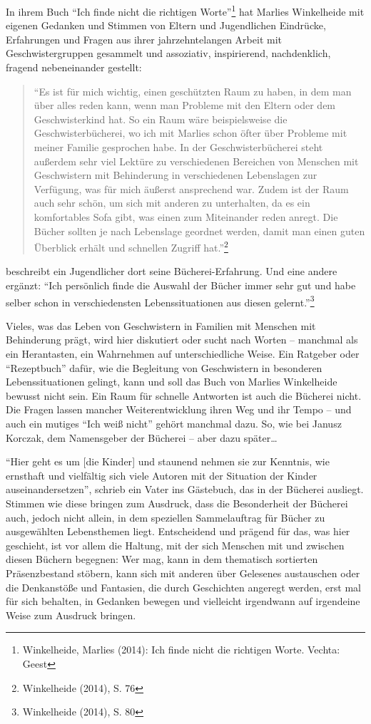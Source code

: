 \documentclass[a4paper,
fontsize=11pt,
oneside,
numbers=noperiodatend,
parskip=half-,
bibliography=totoc,
final
]{scrartcl}
\begin{document}
In ihrem Buch \enquote{Ich finde nicht die richtigen Worte}\footnote{Winkelheide,
  Marlies (2014): Ich finde nicht die richtigen Worte. Vechta: Geest}
hat Marlies Winkelheide mit eigenen Gedanken und Stimmen von Eltern und
Jugendlichen Eindrücke, Erfahrungen und Fragen aus ihrer
jahrzehntelangen Arbeit mit Geschwistergruppen gesammelt und assoziativ,
inspirierend, nachdenklich, fragend nebeneinander gestellt:

\begin{quote}
\enquote{Es ist für mich wichtig, einen geschützten Raum zu haben, in
dem man über alles reden kann, wenn man Probleme mit den Eltern oder dem
Geschwisterkind hat. So ein Raum wäre beispielsweise die
Geschwisterbücherei, wo ich mit Marlies schon öfter über Probleme mit
meiner Familie gesprochen habe. In der Geschwisterbücherei steht
außerdem sehr viel Lektüre zu verschiedenen Bereichen von Menschen mit
Geschwistern mit Behinderung in verschiedenen Lebenslagen zur Verfügung,
was für mich äußerst ansprechend war. Zudem ist der Raum auch sehr
schön, um sich mit anderen zu unterhalten, da es ein komfortables Sofa
gibt, was einen zum Miteinander reden anregt. Die Bücher sollten je nach
Lebenslage geordnet werden, damit man einen guten Überblick erhält und
schnellen Zugriff hat.}\footnote{Winkelheide (2014), S. 76}
\end{quote}

beschreibt ein Jugendlicher dort seine Bücherei-Erfahrung. Und eine
andere ergänzt: \enquote{Ich persönlich finde die Auswahl der Bücher
immer sehr gut und habe selber schon in verschiedensten
Lebenssituationen aus diesen gelernt.}\footnote{Winkelheide (2014), S.
  80}

Vieles, was das Leben von Geschwistern in Familien mit Menschen mit
Behinderung prägt, wird hier diskutiert oder sucht nach Worten --
manchmal als ein Herantasten, ein Wahrnehmen auf unterschiedliche Weise.
Ein Ratgeber oder \enquote{Rezeptbuch} dafür, wie die Begleitung von
Geschwistern in besonderen Lebenssituationen gelingt, kann und soll das
Buch von Marlies Winkelheide bewusst nicht sein. Ein Raum für schnelle
Antworten ist auch die Bücherei nicht. Die Fragen lassen mancher
Weiterentwicklung ihren Weg und ihr Tempo -- und auch ein mutiges
\enquote{Ich weiß nicht} gehört manchmal dazu. So, wie bei Janusz
Korczak, dem Namensgeber der Bücherei -- aber dazu später\ldots{}

\enquote{Hier geht es um {[}die Kinder{]} und staunend nehmen sie zur
Kenntnis, wie ernsthaft und vielfältig sich viele Autoren mit der
Situation der Kinder auseinandersetzen}, schrieb ein Vater ins
Gästebuch, das in der Bücherei ausliegt. Stimmen wie diese bringen zum
Ausdruck, dass die Besonderheit der Bücherei auch, jedoch nicht allein,
in dem speziellen Sammelauftrag für Bücher zu ausgewählten Lebensthemen
liegt. Entscheidend und prägend für das, was hier geschieht, ist vor
allem die Haltung, mit der sich Menschen mit und zwischen diesen Büchern
begegnen: Wer mag, kann in dem thematisch sortierten Präsenzbestand
stöbern, kann sich mit anderen über Gelesenes austauschen oder die
Denkanstöße und Fantasien, die durch Geschichten angeregt werden, erst
mal für sich behalten, in Gedanken bewegen und vielleicht irgendwann auf
irgendeine Weise zum Ausdruck bringen.
\end{document}
